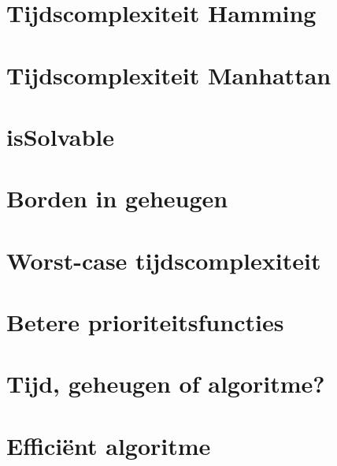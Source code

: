 \documentclass[11pt, a4paper]{article}
\begin{document}
\section*{Tijdscomplexiteit Hamming}
\section*{Tijdscomplexiteit Manhattan}
\section*{isSolvable}
\section*{Borden in geheugen}
\section*{Worst-case tijdscomplexiteit}
\section*{Betere prioriteitsfuncties}
\section*{Tijd, geheugen of algoritme?}
\section*{Effici\"ent algoritme}
\end{document}
